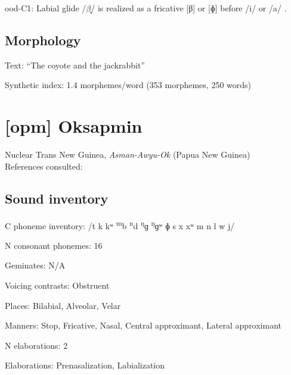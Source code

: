 {\begin{appendixdesc}
\item[ood-C1:] Labial glide /$\beta ̞$/ is realized as a fricative [β] or [ɸ] before /i/ or /a/ \citep[31]{Saxton1963}.
\end{appendixdesc}
\subsection*{Morphology}

\begin{appendixdesc}

\item[Text:] “The coyote and the jackrabbit” \citep[263--266]{Saxton1982}

\item[Synthetic index:] 1.4 morphemes/word (353 morphemes, 250 words)
\end{appendixdesc}
\section*{[opm] Oksapmin}  %
Nuclear Trans New Guinea, \textit{Asman-Awyu-Ok} (Papua New Guinea)\medskip\\
References consulted: \citet{Loughnane2009}

\subsection*{Sound inventory}
\begin{appendixdesc}

\item[C phoneme inventory:] /t k kʷ \textsuperscript{m}b \textsuperscript{n}d \textsuperscript{ŋ}ɡ \textsuperscript{ŋ}ɡʷ ɸ s x xʷ m n l w j/

\item[N consonant phonemes:] 16

\item[Geminates:] N/A

\item[Voicing contrasts:] Obstruent

\item[Places:] Bilabial, Alveolar, Velar

\item[Manners:] Stop, Fricative, Nasal, Central approximant, Lateral approximant

\item[N elaborations:] 2

\item[Elaborations:] Prenasalization, Labialization


\end{appendixdesc}}
